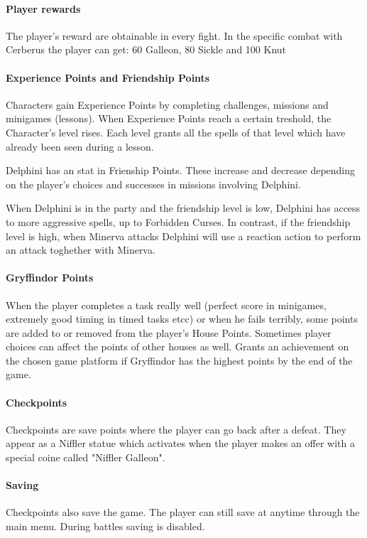 \pagebreak

\paragraph{Player rewards}

The player's reward are obtainable in every fight. In the specific combat with Cerberus the player can get: 60 Galleon, 80 Sickle and 100 Knut


\paragraph{Experience Points and Friendship Points}

Characters gain Experience Points by completing challenges, missions and minigames (lessons). When Experience Points reach a certain treshold, the Character's level rises. 
Each level grants all the spells of that level which have already been seen during a lesson.

Delphini has an stat in Frienship Points. These increase and decrease depending on the player's choices and successes in missions involving Delphini.

When Delphini is in the party and the friendship level is low, Delphini has access to more aggressive spells, up to Forbidden Curses. 
In contrast, if the friendship level is high, when Minerva attacks Delphini will use a reaction action to perform an attack toghether with Minerva.


\paragraph{Gryffindor Points}

When the player completes a task really well (perfect score in minigames, extremely good timing in timed tasks etcc) or when he fails terribly, some points are added to or removed from the player's House Points. Sometimes player choices can affect the points of other houses as well.
Grants an achievement on the chosen game platform if Gryffindor has the highest points by the end of the game.

\paragraph{Checkpoints}

Checkpoints are save points where the player can go back after a defeat. They appear as a Niffler statue which activates when the player makes an offer with a special coine called "Niffler Galleon".

\paragraph{Saving}

Checkpoints also save the game. The player can still save at anytime through the main menu. During battles saving is disabled.
\pagebreak